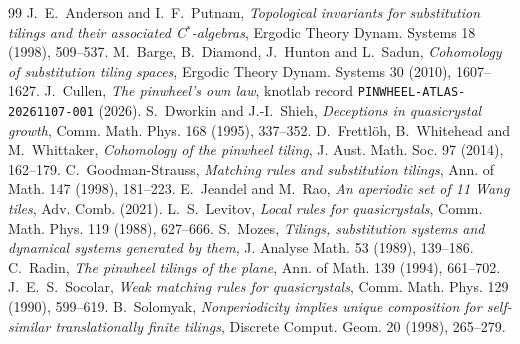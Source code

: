 \documentclass[11pt]{article}
\theoremstyle{definition}
\theoremstyle{remark}
\begin{document}
\begin{thebibliography}{99}
 J.~E.~Anderson and I.~F.~Putnam, \emph{Topological invariants
for substitution tilings and their associated C$^*$-algebras}, Ergodic Theory
Dynam. Systems 18 (1998), 509--537.
 M.~Barge, B.~Diamond, J.~Hunton and L.~Sadun, \emph{Cohomology
of substitution tiling spaces}, Ergodic Theory Dynam. Systems 30 (2010),
1607--1627.
 J.~Cullen, \emph{The pinwheel's own law}, knotlab record
\texttt{PINWHEEL-ATLAS-20261107-001} (2026).
 S.~Dworkin and J.-I.~Shieh, \emph{Deceptions in quasicrystal
growth}, Comm. Math. Phys. 168 (1995), 337--352.
 D.~Frettl\"oh, B.~Whitehead and M.~Whittaker, \emph{Cohomology
of the pinwheel tiling}, J. Aust. Math. Soc. 97 (2014), 162--179.
 C.~Goodman-Strauss, \emph{Matching rules and substitution
tilings}, Ann. of Math. 147 (1998), 181--223.
 E.~Jeandel and M.~Rao, \emph{An aperiodic set of 11 Wang tiles},
Adv. Comb. (2021).
 L.~S.~Levitov, \emph{Local rules for quasicrystals}, Comm.
Math. Phys. 119 (1988), 627--666.
 S.~Mozes, \emph{Tilings, substitution systems and dynamical
systems generated by them}, J. Analyse Math. 53 (1989), 139--186.
 C.~Radin, \emph{The pinwheel tilings of the plane}, Ann. of
Math. 139 (1994), 661--702.
 J.~E.~S.~Socolar, \emph{Weak matching rules for
quasicrystals}, Comm. Math. Phys. 129 (1990), 599--619.
 B.~Solomyak, \emph{Nonperiodicity implies unique composition
for self-similar translationally finite tilings}, Discrete Comput. Geom. 20
(1998), 265--279.
\end{thebibliography}
\end{document}
